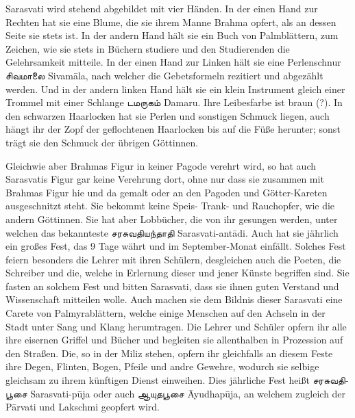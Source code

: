 \documentclass{article}
\newcommand{\TamilText}[1]{\texttamil{#1}}
\newcommand{\tam}[1]{\TamilText{#1}}
\begin{document}
Sarasvati wird stehend abgebildet mit vier Händen. In der einen Hand zur Rechten hat sie eine Blume, die sie ihrem Manne Brahma opfert, als an dessen Seite sie stets ist. In der andern Hand hält sie ein Buch von Palmblättern, zum Zeichen, wie sie stets in Büchern studiere und den Studierenden die Gelehrsamkeit mitteile. In der einen Hand zur Linken hält sie eine Perlenschnur \tam{சிவமாலை} Sivam\={a}la, nach welcher die Gebetsformeln rezitiert und abgezählt werden. Und in der andern linken Hand hält sie ein klein Instrument gleich einer Trommel mit einer Schlange \tam{டமருகம்} Damaru. Ihre Leibesfarbe ist braun (?). In den schwarzen Haarlocken hat sie Perlen und sonstigen Schmuck liegen, auch hängt ihr der Zopf der geflochtenen Haarlocken bis auf die Füße herunter; sonst trägt sie den Schmuck der übrigen Göttinnen.

Gleichwie aber Brahmas Figur in keiner Pagode verehrt wird, so hat auch Sarasvatis Figur gar keine Verehrung dort, ohne nur dass sie zusammen mit Brahmas Figur hie und da gemalt oder an den Pagoden und Götter-Kareten ausgeschnitzt steht. Sie bekommt keine Speis- Trank- und Rauchopfer, wie die andern Göttinnen. Sie hat aber Lobbücher, die von ihr gesungen werden, unter welchen das bekannteste \tam{சரசுவதியந்தாதி} Sarasvati-ant\={a}di. Auch hat sie jährlich ein großes Fest, das 9 Tage währt und im September-Monat einfällt. Solches Fest feiern besonders die Lehrer mit ihren Schülern, desgleichen auch die Poeten, die Schreiber und die, welche in Erlernung dieser und jener Künste begriffen sind. Sie fasten an solchem Fest und bitten Sarasvati, dass sie ihnen guten Verstand und Wissenschaft mitteilen wolle. Auch machen sie dem Bildnis dieser Sarasvati eine Carete von Palmyrablättern, welche einige Menschen auf den Achseln in der Stadt unter Sang und Klang herumtragen. Die Lehrer und Schüler opfern ihr alle ihre eisernen Griffel und Bücher und begleiten sie allenthalben in Prozession auf den Straßen. Die, so in der Miliz stehen, opfern ihr gleichfalls an diesem Feste ihre Degen, Flinten, Bogen, Pfeile und andre Gewehre, wodurch sie selbige gleichsam zu ihrem künftigen Dienst einweihen. Dies jährliche Fest heißt \tam{சரசுவதிபூசை} Sarasvati-p\={u}ja oder auch \tam{ஆயுதபூசை} \={A}yudhap\={u}ja, an welchem zugleich der P\={a}rvati und Lakschmi geopfert wird.
\end{document}
